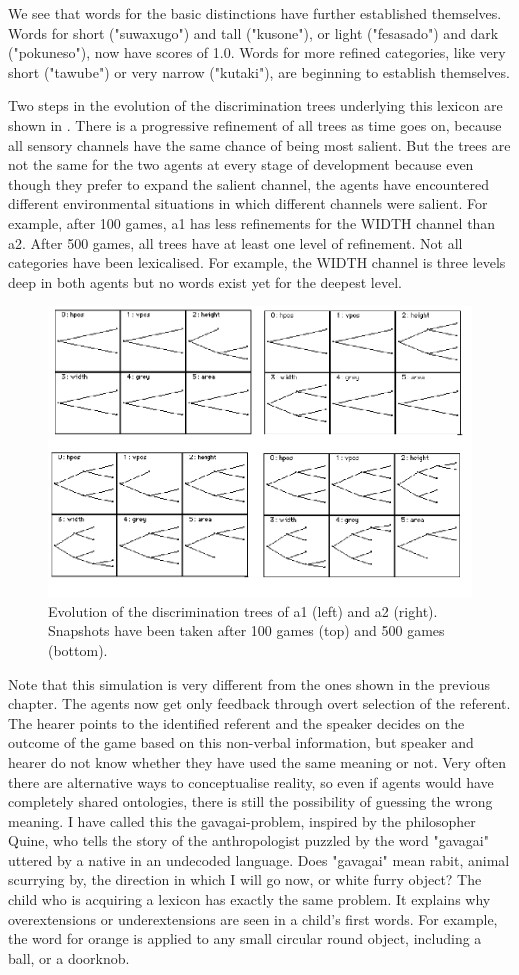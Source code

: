 We see that words for the basic distinctions have further established
themselves. Words for short ("suwaxugo") and tall ("kusone"), or light ("fesasado") and dark 
("pokuneso"), now have scores of 1.0. Words for more refined categories, like very short ("tawube") or 
very narrow ("kutaki"), are beginning to establish themselves.  

Two steps in the evolution of the discrimination trees
underlying this lexicon are shown in .
There is a progressive refinement 
of all trees as time goes on, 
because all sensory channels have the same chance
of being most salient. But the trees are not 
the same for the two agents at every stage
of development because even though they prefer to expand
the salient channel, the agents have encountered 
different environmental situations in which different
channels were salient. For example, after 100 
games, {\bfshape  a1} has less refinements for the 
WIDTH channel than {\bfshape  a2}. 
After 500 games, all trees 
have at least one level of refinement. Not all 
categories have been lexicalised. For example, the 
WIDTH channel is three levels deep in both 
agents but no words exist yet for the deepest 
level. 
\begin{figure}[htbp]
  \centerline{\includegraphics[width=.65\textwidth]{chap6/figs/gdis}}
\caption{\label{gdis1} Evolution of the discrimination
trees of {\bfshape  a1} (left) and {\bfshape  a2} (right).
Snapshots have been taken after 100 games (top) and 500 
games (bottom).} 
\end{figure}

Note that this simulation is very different from the 
ones shown in the previous chapter. The agents now get 
only feedback through overt selection of the referent. 
The hearer points to the identified referent and the speaker 
decides on the outcome of the game based on this 
non-verbal information, but speaker and hearer do not 
know whether they have used the same meaning or not. 
Very often there are alternative ways
to conceptualise reality, so even if agents would have
completely shared ontologies, there is still the possibility 
of guessing the wrong meaning. I have called this
the gavagai-problem, inspired by the philosopher
Quine, who tells the story of the anthropologist 
puzzled by the word "gavagai" uttered by a native 
in an undecoded language. Does "gavagai" mean rabit, animal 
scurrying by, the direction in which I will go 
now, or white furry object? 
The child who is acquiring a lexicon has
exactly the same problem. It explains why 
overextensions or underextensions
are seen in a child's first words. For example, 
the word for orange is applied to any small circular round 
object, including a ball, or a doorknob.

